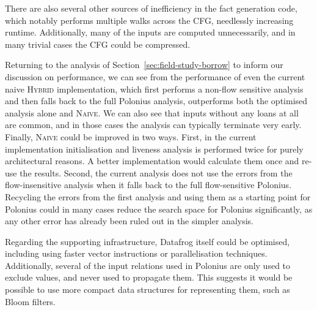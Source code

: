 \documentclass[11pt,a4paper,twoside,openany,draft]{report}
\begin{document}
There are also several other sources of inefficiency in the fact generation
code, which notably performs multiple walks across the CFG, needlessly
increasing runtime. Additionally, many of the inputs are computed unnecessarily,
and in many trivial cases the CFG could be compressed.

Returning to the analysis of Section~\ref{sec:field-study-borrow} to inform our
discussion on performance, we can see from the performance of even the current
naive \textsc{Hybrid} implementation, which first performs a non-flow sensitive
analysis and then falls back to the full Polonius analysis, outperforms both the
optimised analysis alone and \textsc{Naive}. We can also see that inputs without
any loans at all are common, and in those cases the analysis can typically
terminate very early. Finally, \textsc{Naive} could be improved in two ways.
First, in the current implementation initialisation and liveness analysis is
performed twice for purely architectural reasons. A better implementation would
calculate them once and re-use the results. Second, the current analysis does
not use the errors from the flow-insensitive analysis when it falls back to the
full flow-sensitive Polonius. Recycling the errors from the first analysis and
using them as a starting point for Polonius could in many cases reduce the
search space for Polonius significantly, as any other error has already been
ruled out in the simpler analysis.

Regarding the supporting infrastructure, Datafrog itself could be optimised,
including using faster vector instructions or parallelisation techniques.
Additionally, several of the input relations used in Polonius are only used to
exclude values, and never used to propagate them. This suggests it would be
possible to use more compact data structures for representing them, such as
Bloom filters.
\end{document}

